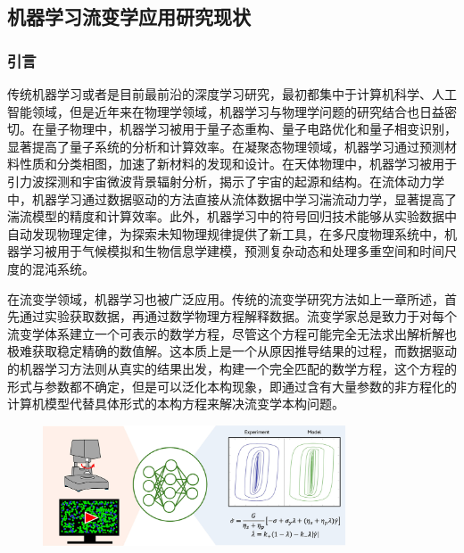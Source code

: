 \subsection{机器学习流变学应用研究现状}
\subsubsection{引言}
传统机器学习或者是目前最前沿的深度学习研究，最初都集中于计算机科学、人工智能领域，但是近年来在物理学领域，机器学习与物理学问题的研究结合也日益密切\cite{choudhary2022recent}。在量子物理中，机器学习被用于量子态重构、量子电路优化和量子相变识别，显著提高了量子系统的分析和计算效率\cite{biamonte2017quantum}。在凝聚态物理领域，机器学习通过预测材料性质和分类相图，加速了新材料的发现和设计\cite{choudhary2022recent}。在天体物理中，机器学习被用于引力波探测和宇宙微波背景辐射分析，揭示了宇宙的起源和结构\cite{bufano2023machine}。在流体动力学中，机器学习通过数据驱动的方法直接从流体数据中学习湍流动力学，显著提高了湍流模型的精度和计算效率\cite{bruntonMachineLearningFluid2020}。此外，机器学习中的符号回归技术能够从实验数据中自动发现物理定律，为探索未知物理规律提供了新工具\cite{udrescuAIFeynmanPhysicsinspired2020}，在多尺度物理系统中，机器学习被用于气候模拟和生物信息学建模，预测复杂动态和处理多重空间和时间尺度的混沌系统。

在流变学领域，机器学习也被广泛应用。传统的流变学研究方法如上一章所述，首先通过实验获取数据，再通过数学物理方程解释数据。流变学家总是致力于对每个流变学体系建立一个可表示的数学方程，尽管这个方程可能完全无法求出解析解也极难获取稳定精确的数值解。这本质上是一个从原因推导结果的过程，而数据驱动的机器学习方法则从真实的结果出发，构建一个完全匹配的数学方程，这个方程的形式与参数都不确定，但是可以泛化本构现象，即通过含有大量参数的非方程化的计算机模型代替具体形式的本构方程来解决流变学本构问题\cite{colenMachineLearningActivenematic2021,bahiuddinReviewModelingSchemes2024,mangalDatadrivenTechniquesRheology2025}。
\begin{figure}[htbp]
  \centering
  \includegraphics[width=0.8\textwidth]{Fig/datadrivenintro.jpg}
\end{figure}

